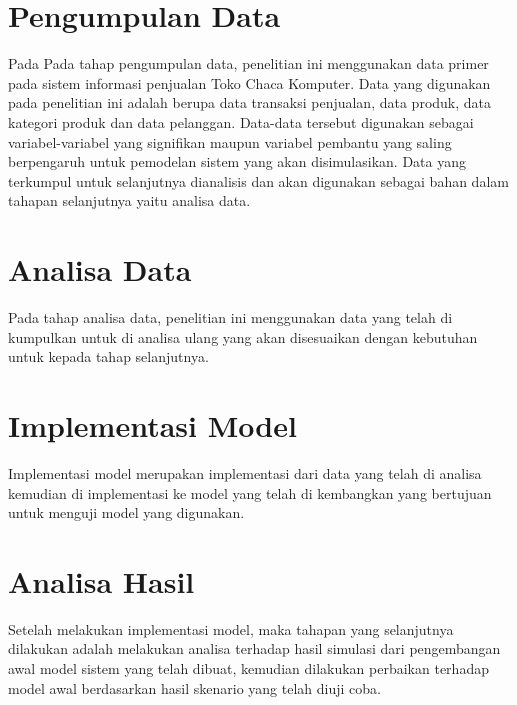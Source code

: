 \section{Pengumpulan Data}
Pada Pada tahap pengumpulan data, penelitian ini menggunakan data primer pada sistem informasi penjualan Toko Chaca Komputer. Data yang digunakan pada penelitian ini adalah berupa data transaksi penjualan, data produk, data kategori produk dan data pelanggan. Data-data tersebut digunakan sebagai variabel-variabel yang signifikan maupun variabel pembantu yang saling berpengaruh untuk pemodelan sistem yang akan disimulasikan. Data yang terkumpul untuk selanjutnya dianalisis dan akan digunakan sebagai bahan dalam tahapan selanjutnya yaitu analisa data.

\section{Analisa Data}

Pada tahap analisa data, penelitian ini menggunakan data yang telah di kumpulkan untuk di analisa ulang yang akan disesuaikan dengan kebutuhan untuk kepada tahap selanjutnya.

\section{Implementasi Model}
Implementasi model merupakan implementasi dari data yang telah di analisa kemudian di implementasi ke model yang telah di kembangkan yang bertujuan untuk menguji model yang digunakan.

\section{Analisa Hasil}
Setelah melakukan implementasi model, maka tahapan yang selanjutnya dilakukan adalah melakukan analisa terhadap hasil simulasi dari pengembangan awal model sistem yang telah dibuat, kemudian dilakukan perbaikan terhadap model awal berdasarkan hasil skenario yang telah diuji coba.

